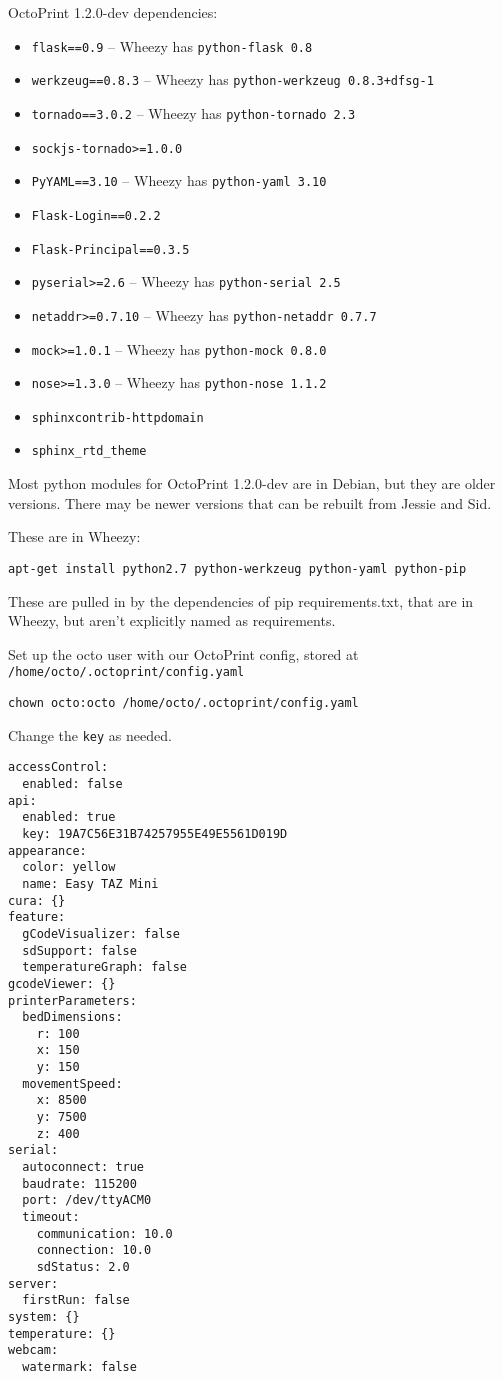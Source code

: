 OctoPrint 1.2.0-dev dependencies:

\begin{itemize}
\item{\verb|flask==0.9| -- Wheezy has \verb|python-flask 0.8|}
\item{\verb|werkzeug==0.8.3| -- Wheezy has \verb|python-werkzeug 0.8.3+dfsg-1|}
\item{\verb|tornado==3.0.2| -- Wheezy has \verb|python-tornado 2.3|}
\item{\verb|sockjs-tornado>=1.0.0|}
\item{\verb|PyYAML==3.10| -- Wheezy has \verb|python-yaml 3.10|}
\item{\verb|Flask-Login==0.2.2|}
\item{\verb|Flask-Principal==0.3.5|}
\item{\verb|pyserial>=2.6| -- Wheezy has \verb|python-serial 2.5|}
\item{\verb|netaddr>=0.7.10| -- Wheezy has \verb|python-netaddr 0.7.7|}
\item{\verb|mock>=1.0.1| -- Wheezy has \verb|python-mock 0.8.0|}
\item{\verb|nose>=1.3.0| -- Wheezy has \verb|python-nose 1.1.2|}
\item{\verb|sphinxcontrib-httpdomain|}
\item{\verb|sphinx_rtd_theme|}
\end{itemize}

Most python modules for OctoPrint 1.2.0-dev are in Debian, but they are
older versions. There may be newer versions that can be rebuilt from Jessie
and Sid.

These are in Wheezy:

\verb|apt-get install python2.7 python-werkzeug python-yaml python-pip|

These are pulled in by the dependencies of pip requirements.txt,
that are in Wheezy, but aren't explicitly named as requirements.

Set up the octo user with our OctoPrint config, stored at
\verb|/home/octo/.octoprint/config.yaml|

\verb|chown octo:octo /home/octo/.octoprint/config.yaml|

Change the \verb|key| as needed.

\begin{verbatim}
accessControl:
  enabled: false
api:
  enabled: true
  key: 19A7C56E31B74257955E49E5561D019D
appearance:
  color: yellow
  name: Easy TAZ Mini
cura: {}
feature:
  gCodeVisualizer: false
  sdSupport: false
  temperatureGraph: false
gcodeViewer: {}
printerParameters:
  bedDimensions:
    r: 100
    x: 150
    y: 150
  movementSpeed:
    x: 8500
    y: 7500
    z: 400
serial:
  autoconnect: true
  baudrate: 115200
  port: /dev/ttyACM0
  timeout:
    communication: 10.0
    connection: 10.0
    sdStatus: 2.0
server:
  firstRun: false
system: {}
temperature: {}
webcam:
  watermark: false
\end{verbatim}

